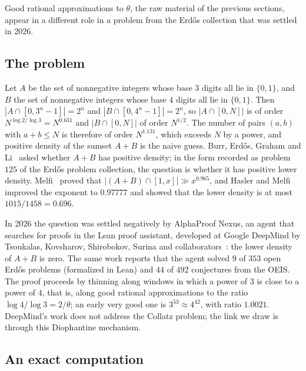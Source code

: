 Good rational approximations to $\theta$, the raw material of the previous sections, appear in a different role
in a problem from the Erd\H{o}s collection that was settled in 2026.

\subsection{The problem}

Let $A$ be the set of nonnegative integers whose base $3$ digits all lie in
$\{0,1\}$, and $B$ the set of nonnegative integers whose base $4$ digits all
lie in $\{0,1\}$. Then $|A\cap[0,3^n-1]|=2^n$ and $|B\cap[0,4^n-1]|=2^n$, so
$|A\cap[0,N]|$ is of order $N^{\log2/\log3}=N^{0.631}$ and $|B\cap[0,N]|$ of
order $N^{1/2}$. The number of pairs $(a,b)$ with $a+b\leq N$ is therefore of
order $N^{1.131}$, which exceeds $N$ by a power, and positive density of the
sumset $A+B$ is the naive guess. Burr, Erd\H{o}s, Graham and
Li~\cite{burr1996} asked whether $A+B$ has positive density; in the form recorded as problem $125$ of the Erd\H{o}s problem collection, the question is whether it has positive lower density.
Melfi~\cite{melfi2001} proved that
$|(A+B)\cap[1,x]|\gg x^{0.965}$, and Hasler and Melfi~\cite{haslermelfi2024} improved the exponent to
$0.97777$ and showed that the lower density is at most
$1015/1458=0.696$.

In 2026 the question was settled negatively by AlphaProof Nexus, an agent
that searches for proofs in the Lean proof assistant, developed at Google
DeepMind by Tsoukalas, Kovsharov, Shirobokov, Surina and
collaborators~\cite{tsoukalas2026}: the lower density of $A+B$ is zero. The
same work reports that the agent solved $9$ of $353$ open Erd\H{o}s
problems (formalized in Lean) and $44$ of $492$ conjectures from the OEIS. The proof proceeds by
thinning along windows in which a power of $3$ is close to a power of $4$,
that is, along good rational approximations to the ratio
$\log4/\log3=2/\theta$; an
early very good one is $3^{53}\approx4^{42}$, with ratio $1.0021$. DeepMind's
work does not address the Collatz problem; the link we draw is through this
Diophantine mechanism.

\subsection{An exact computation}

